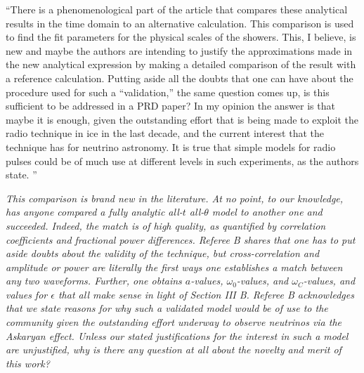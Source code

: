 \documentclass[12pt]{article}
\begin{document}
``There is a phenomenological part of the article that compares these analytical results in the time domain to an alternative calculation. This comparison is used to find the fit parameters for the physical scales of the showers. This, I believe, is new and maybe the authors are intending to justify the approximations made in the new analytical expression by making a detailed comparison of the result with a reference calculation. Putting aside all the doubts that one can have about the procedure used for such a ``validation,'' the same question comes up, is this sufficient to be addressed in a PRD paper? In my opinion the answer is that maybe it is enough, given the outstanding effort that is being made to exploit the radio technique in ice in the last decade, and the current interest that the technique has for neutrino astronomy. It is true that simple models for radio pulses could be of much use at different levels in such experiments, as the authors state. ''

\textit{This comparison is brand new in the literature.  At no point, to our knowledge, has anyone compared a fully analytic all-$t$ all-$\theta$ model to another one and succeeded.  Indeed, the match is of high quality, as quantified by correlation coefficients and fractional power differences.  Referee B shares that one has to put aside doubts about the validity of the technique, but cross-correlation and amplitude or power are literally the first ways one establishes a match between any two waveforms.  Further, one obtains $a$-values, $\omega_0$-values, and $\omega_C$-values, and values for $\epsilon$ that all make sense in light of Section III B.  Referee B acknowledges that we state reasons for why such a validated model would be of use to the community given the outstanding effort underway to observe neutrinos via the Askaryan effect.  Unless our stated justifications for the interest in such a model are unjustified, why is there any question at all about the novelty and merit of this work?}
\end{document}
